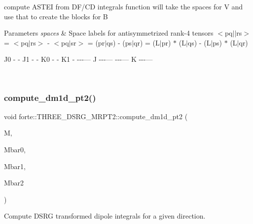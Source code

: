 compute A\+S\+T\+EI from D\+F/\+CD integrals function will take the spaces for V and use that to create the blocks for B 
\begin{DoxyParams}{Parameters}
{\em spaces} & Space labels for antisymmetrized rank-\/4 tensors $<$pq$\vert$$\vert$rs$>$ = $<$pq$\vert$rs$>$ -\/ $<$pq$\vert$sr$>$ = (pr$\vert$qs) -\/ (ps$\vert$qr) = (L$\vert$pr) $\ast$ (L$\vert$qs) -\/ (L$\vert$ps) $\ast$ (L$\vert$qr)
\begin{DoxyItemize}
\item J0 -\/ -\/ J1 -\/ -\/ K0 -\/ -\/ K1 -\/ -\/-\/-\/--- J -\/-\/-\/--- -\/-\/-\/--- K -\/-\/-\/---
\end{DoxyItemize}\\
\hline
\end{DoxyParams}
\mbox{\label{classforte_1_1_t_h_r_e_e___d_s_r_g___m_r_p_t2_a0a73655f2f827169cce1c254950b9e8f}} 
\subsubsection{\texorpdfstring{compute\+\_\+dm1d\+\_\+pt2()}{compute\_dm1d\_pt2()}}
{\footnotesize\ttfamily void forte\+::\+T\+H\+R\+E\+E\+\_\+\+D\+S\+R\+G\+\_\+\+M\+R\+P\+T2\+::compute\+\_\+dm1d\+\_\+pt2 (\begin{DoxyParamCaption}\item[{Blocked\+Tensor \&}]{M,  }\item[{double \&}]{Mbar0,  }\item[{Blocked\+Tensor \&}]{Mbar1,  }\item[{Blocked\+Tensor \&}]{Mbar2 }\end{DoxyParamCaption})\hspace{0.3cm}{\ttfamily [protected]}}



Compute D\+S\+RG transformed dipole integrals for a given direction. 

\mbox{\label{classforte_1_1_t_h_r_e_e___d_s_r_g___m_r_p_t2_af7cee9b490ef09652f35cbfd48f8fe6a}} 

